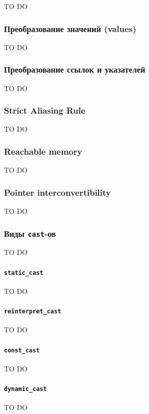 \documentclass{article}
\begin{document}
TO DO

\subsubsection{Преобразование значений (values)}

TO DO

\subsubsection{Преобразование ссылок и указателей}

TO DO

\subsubsection{Strict Aliasing Rule}

TO DO

\subsubsection{Reachable memory}

TO DO

\subsubsection{Pointer interconvertibility}

TO DO

\subsubsection{Виды \texttt{cast}-ов}
TO DO

\paragraph{\texttt{static\_cast}}
TO DO

\paragraph{\texttt{reinterpret\_cast}}
TO DO

\paragraph{\texttt{const\_cast}}
TO DO

\paragraph{\texttt{dynamic\_cast}}
TO DO
\end{document}
